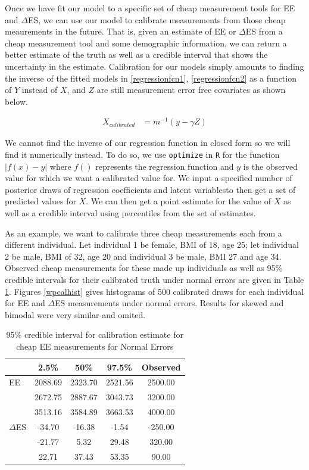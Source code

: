 \documentclass[11pt]{article}\usepackage[]{graphicx}\usepackage[]{color}
\begin{document}
Once we have fit our model to a specific set of cheap measurement tools for EE and $\Delta$ES, we can use our model to calibrate measurements from those cheap meaurements in the future. That is, given an estimate of EE or $\Delta$ES from a cheap measurement tool and some demographic information, we can return a better estimate of the truth as well as a credible interval that shows the uncertainty in the estimate. Calibration for our models simply amounts to finding the inverse of the fitted models in \eqref{regressionfcn1}, \eqref{regressionfcn2} as a function of $Y$ instead of $X$, and $Z$ are still measurement error free covariates as shown below.

\begin{align}
  X_{calibrated} &= m^{-1}(y-\gamma Z) 
\end{align}

We cannot find the inverse of our regression function in closed form so we will find it numerically instead. To do so, we use \texttt{optimize} in \texttt{R} for the function $|f(x)-y|$ where $f()$ represents the regression function and $y$ is the observed value for which we want a calibrated value for. We input a specified number of posterior draws of regression coefficients and latent variablesto then get a set of predicted values for $X$. We can then get a point estimate for the value of $X$ as well as a credible interval using percentiles from the set of estimates.


As an example, we want to calibrate three cheap measurements each from a different individual. Let individual 1 be female, BMI of 18, age 25; let individual 2 be male, BMI of 32, age 20 and individual 3 be male, BMI 27 and age 34. Observed cheap measurements for these made up individuals as well as 95\% credible intervals for their calibrated truth under normal errors are given in Table \ref{calibratedee}. Figures \ref{wpcalhist} gives histograms of 500 calibrated draws for each individual for EE and $\Delta$ES measurements under normal errors. Results for skewed and bimodal were very similar and omited.

\begin{table}[ht]
\centering
\begin{tabular}{l|ccc|c}
  \hline
 & 2.5\% & 50\% & 97.5\% & Observed \\ 
  \hline
EE & 2088.69 & 2323.70 & 2521.56 & 2500.00 \\ 
  & 2672.75 & 2887.67 & 3043.73 & 3200.00 \\ 
  & 3513.16 & 3584.89 & 3663.53 & 4000.00 \\ 
  $\Delta$ES & -34.70 & -16.38 & -1.54 & -250.00 \\ 
  & -21.77 & 5.32 & 29.48 & 320.00 \\ 
  & 22.71 & 37.43 & 53.35 & 90.00 \\ 
   \hline
\end{tabular}
\caption{95\% credible interval for calibration estimate for cheap EE measurements for Normal Errors} 
\label{calibratedee}
\end{table}
\end{document}
